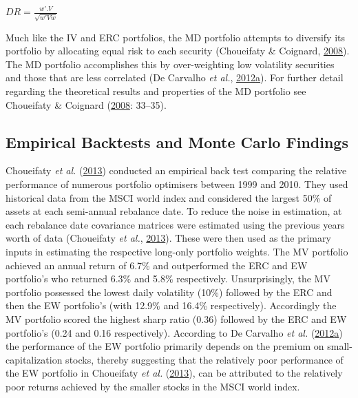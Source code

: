 \documentclass[11pt,preprint, authoryear]{elsarticle}
\numberwithin{equation}{section}
\numberwithin{figure}{section}
\numberwithin{table}{section}
\begin{document}
\begin{center} 
$DR= \frac{w'.V}{\sqrt{w'Vw}}$ 
\end{center}

Much like the IV and ERC portfolios, the MD portfolio attempts to
diversify its portfolio by allocating equal risk to each security
(Choueifaty \& Coignard, \protect\hyperlink{ref-choueifaty2008}{2008}).
The MD portfolio accomplishes this by over-weighting low volatility
securities and those that are less correlated (De Carvalho \emph{et
al.},
\protect\hyperlink{ref-leote}{2012}\protect\hyperlink{ref-leote}{a}).
For further detail regarding the theoretical results and properties of
the MD portfolio see Choueifaty \& Coignard
(\protect\hyperlink{ref-choueifaty2008}{2008}: 33--35).

\hypertarget{empirical-backtests-and-monte-carlo-findings}{%
\subsection{Empirical Backtests and Monte Carlo
Findings}\label{empirical-backtests-and-monte-carlo-findings}}

Choueifaty \emph{et al.} (\protect\hyperlink{ref-choueifaty2013}{2013})
conducted an empirical back test comparing the relative performance of
numerous portfolio optimisers between 1999 and 2010. They used
historical data from the MSCI world index and considered the largest
50\% of assets at each semi-annual rebalance date. To reduce the noise
in estimation, at each rebalance date covariance matrices were estimated
using the previous years worth of data (Choueifaty \emph{et al.},
\protect\hyperlink{ref-choueifaty2013}{2013}). These were then used as
the primary inputs in estimating the respective long-only portfolio
weights. The MV portfolio achieved an annual return of 6.7\% and
outperformed the ERC and EW portfolio's who returned 6.3\% and 5.8\%
respectively. Unsurprisingly, the MV portfolio possessed the lowest
daily volatility (10\%) followed by the ERC and then the EW portfolio's
(with 12.9\% and 16.4\% respectively). Accordingly the MV portfolio
scored the highest sharp ratio (0.36) followed by the ERC and EW
portfolio's (0.24 and 0.16 respectively). According to De Carvalho
\emph{et al.}
(\protect\hyperlink{ref-leote}{2012}\protect\hyperlink{ref-leote}{a})
the performance of the EW portfolio primarily depends on the premium on
small-capitalization stocks, thereby suggesting that the relatively poor
performance of the EW portfolio in Choueifaty \emph{et al.}
(\protect\hyperlink{ref-choueifaty2013}{2013}), can be attributed to the
relatively poor returns achieved by the smaller stocks in the MSCI world
index.
\end{document}
